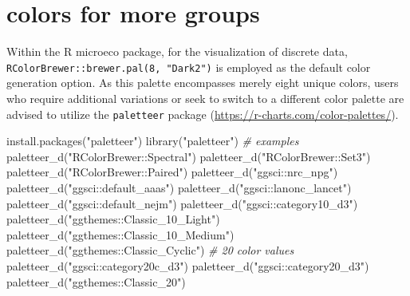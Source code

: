 \documentclass[
]{book}
\newenvironment{Shaded}{\begin{snugshade}}{\end{snugshade}}
\newcommand{\CommentTok}[1]{\textcolor[rgb]{0.56,0.35,0.01}{\textit{#1}}}
\newcommand{\FunctionTok}[1]{\textcolor[rgb]{0.00,0.00,0.00}{#1}}
\newcommand{\NormalTok}[1]{#1}
\newcommand{\StringTok}[1]{\textcolor[rgb]{0.31,0.60,0.02}{#1}}
\begin{document}
\hypertarget{colors-for-more-groups}{%
\section{colors for more groups}\label{colors-for-more-groups}}

Within the R microeco package, for the visualization of discrete data,
\texttt{RColorBrewer::brewer.pal(8,\ "Dark2")} is employed as the default color generation option.
As this palette encompasses merely eight unique colors,
users who require additional variations or seek to switch to a different color palette are advised to utilize the \texttt{paletteer} package (\url{https://r-charts.com/color-palettes/}).

\begin{Shaded}
\begin{Highlighting}[]
\FunctionTok{install.packages}\NormalTok{(}\StringTok{"paletteer"}\NormalTok{)}
\FunctionTok{library}\NormalTok{(}\StringTok{"paletteer"}\NormalTok{)}
\CommentTok{\# examples}
\FunctionTok{paletteer\_d}\NormalTok{(}\StringTok{"RColorBrewer::Spectral"}\NormalTok{)}
\FunctionTok{paletteer\_d}\NormalTok{(}\StringTok{"RColorBrewer::Set3"}\NormalTok{)}
\FunctionTok{paletteer\_d}\NormalTok{(}\StringTok{"RColorBrewer::Paired"}\NormalTok{)}
\FunctionTok{paletteer\_d}\NormalTok{(}\StringTok{"ggsci::nrc\_npg"}\NormalTok{)}
\FunctionTok{paletteer\_d}\NormalTok{(}\StringTok{"ggsci::default\_aaas"}\NormalTok{)}
\FunctionTok{paletteer\_d}\NormalTok{(}\StringTok{"ggsci::lanonc\_lancet"}\NormalTok{)}
\FunctionTok{paletteer\_d}\NormalTok{(}\StringTok{"ggsci::default\_nejm"}\NormalTok{)}
\FunctionTok{paletteer\_d}\NormalTok{(}\StringTok{"ggsci::category10\_d3"}\NormalTok{)}
\FunctionTok{paletteer\_d}\NormalTok{(}\StringTok{"ggthemes::Classic\_10\_Light"}\NormalTok{)}
\FunctionTok{paletteer\_d}\NormalTok{(}\StringTok{"ggthemes::Classic\_10\_Medium"}\NormalTok{)}
\FunctionTok{paletteer\_d}\NormalTok{(}\StringTok{"ggthemes::Classic\_Cyclic"}\NormalTok{)}
\CommentTok{\# 20 color values}
\FunctionTok{paletteer\_d}\NormalTok{(}\StringTok{"ggsci::category20c\_d3"}\NormalTok{)}
\FunctionTok{paletteer\_d}\NormalTok{(}\StringTok{"ggsci::category20\_d3"}\NormalTok{)}
\FunctionTok{paletteer\_d}\NormalTok{(}\StringTok{"ggthemes::Classic\_20"}\NormalTok{)}
\end{Highlighting}
\end{Shaded}
\end{document}
